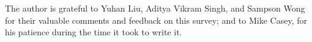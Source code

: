 \documentclass[biber,plain]{nowfnt} %
\begin{document}
%

\begin{acknowledgements}
The author is grateful to Yuhan Liu, Aditya Vikram Singh, and Sampson Wong for their valuable comments and feedback on this survey; and to Mike Casey, for his patience during the time it took to write it.
\end{acknowledgements}
\end{document}

